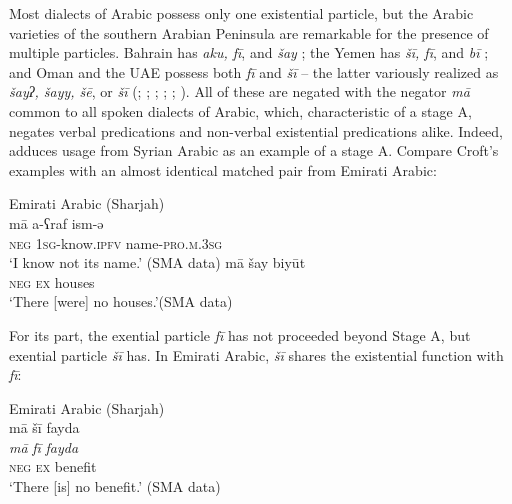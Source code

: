 \documentclass[output=paper,colorlinks,citecolor=brown]{langscibook}
\begin{document}
Most dialects of Arabic possess only one existential particle, but the Arabic varieties of the southern Arabian Peninsula are remarkable for the presence of multiple particles. Bahrain has \textit{aku, fī}, and \textit{šay} \citep[110]{holes2016a}; the Yemen has \textit{šī, fī}, and \textit{bī} \citep[346–348, maps 136 \& 137]{behnstedt2016a}; and Oman and the UAE possess both \textit{fī} and \textit{šī} – the latter variously realized as \textit{šayʔ, šayy, šē}, or \textit{šī} (\citealp[112]{reinhardt1894a}; \citealp[170]{johnstone1967a}; \citealp[24]{brockett1985a}; \citealp[71]{holes1990a}; \citealp[24--28]{holes2016a}; \citealp[162]{davey2016a}). All of these are negated with the negator \textit{mā} common to all spoken dialects of Arabic, which, characteristic of a stage A, negates verbal predications and non-verbal existential predications alike. Indeed, \citep[7]{Croft1991} adduces usage from Syrian Arabic as an example of a stage A. Compare Croft’s examples with an almost identical matched pair from Emirati Arabic:

\ea Emirati Arabic (Sharjah)\label{ex:WiAR-11}\\
  \ea
  	\gll mā a-ʕraf ism-ǝ\\
  	\textsc{neg} \textsc{1sg}-know.\textsc{ipfv} name-\textsc{pro.m.3sg}\\
  	\glt ‘I know not its name.’ (SMA data)
  \ex
  	\gll mā šay biyūt\\
  	\textsc{neg} \textsc{ex} houses \\
  	\glt ‘There [were] no houses.’(SMA data)
\z \z

For its part, the exential particle \textit{fī} has not proceeded beyond Stage A, but exential particle \textit{šī} has. In Emirati Arabic, \textit{šī} shares the existential function with \textit{fī}:

\ea Emirati Arabic (Sharjah)\label{ex:WiAR-12}\\
	\glll mā šī fayda\\
	\textit{mā} \textit{fī} \textit{fayda}\\
	\textsc{neg} \textsc{ex} benefit\\
	\glt ‘There [is] no benefit.’ (SMA data)
\z
\end{document}
